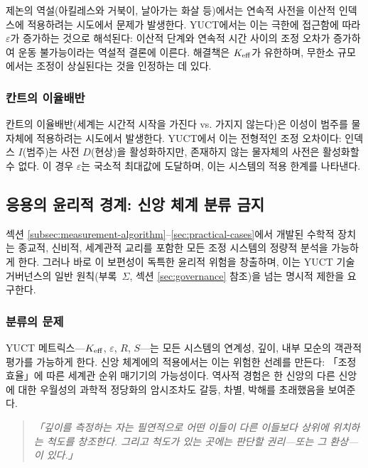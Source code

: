 \documentclass[11pt,a4paper]{article}
\newcommand{\eps}{\varepsilon}
\begin{document}
	제논의 역설(아킬레스와 거북이, 날아가는 화살 등)에서는 연속적 사전을 이산적 인덱스에 적용하려는 시도에서 문제가 발생한다. YUCT에서는 이는 극한에 접근함에 따라 \(\eps\)가 증가하는 것으로 해석된다: 이산적 단계와 연속적 시간 사이의 조정 오차가 증가하여 운동 불가능이라는 역설적 결론에 이른다. 해결책은 \(\Keff\)가 유한하며, 무한소 규모에서는 조정이 상실된다는 것을 인정하는 데 있다.
	
	\subsubsection{칸트의 이율배반}
	
	칸트의 이율배반(세계는 시간적 시작을 가진다 vs. 가지지 않는다)은 이성이 범주를 물자체에 적용하려는 시도에서 발생한다. YUCT에서 이는 전형적인 조정 오차이다: 인덱스 \(I\)(범주)는 사전 \(D\)(현상)을 활성화하지만, 존재하지 않는 물자체의 사전은 활성화할 수 없다. 이 경우 \(\eps\)는 국소적 최대값에 도달하며, 이는 시스템의 적용 한계를 나타낸다.
	
	\subsection{응용의 윤리적 경계: 신앙 체계 분류 금지}
	\label{subsec:belief-classification}
	
	섹션 \ref{subsec:measurement-algorithm}–\ref{sec:practical-cases}에서 개발된 수학적 장치는 종교적, 신비적, 세계관적 교리를 포함한 모든 조정 시스템의 정량적 분석을 가능하게 한다. 그러나 바로 이 보편성이 독특한 윤리적 위험을 창출하며, 이는 YUCT 기술 거버넌스의 일반 원칙(부록~$\Sigma$, 섹션 \ref{sec:governance} 참조)을 넘는 명시적 제한을 요구한다.
	
	\subsubsection{분류의 문제}
	
	YUCT 메트릭스—$\Keff$, $\eps$, $R$, $S$—는 모든 시스템의 연계성, 깊이, 내부 모순의 객관적 평가를 가능하게 한다. 신앙 체계에의 적용에서는 이는 위험한 선례를 만든다: 「조정 효율」에 따른 세계관 순위 매기기의 가능성이다. 역사적 경험은 한 신앙의 다른 신앙에 대한 우월성의 과학적 정당화의 암시조차도 갈등, 차별, 박해를 초래했음을 보여준다.
	
	\begin{quote}
		\itshape
		「깊이를 측정하는 자는 필연적으로 어떤 이들이 다른 이들보다 상위에 위치하는 척도를 창조한다. 그리고 척도가 있는 곳에는 판단할 권리—또는 그 환상—이 있다.」
	\end{quote}
	
\end{document}
